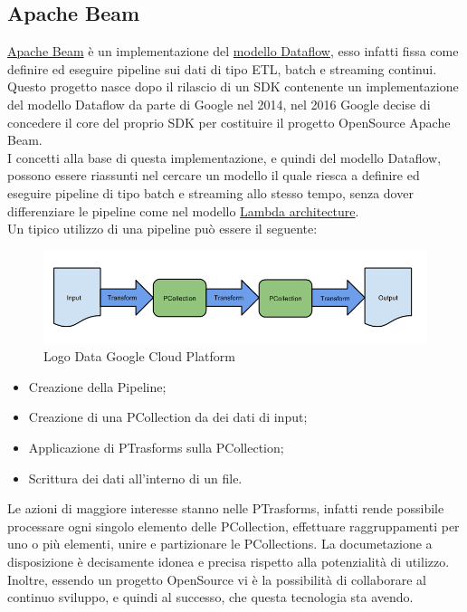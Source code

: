 \subsection{Apache Beam}
\href{http://www.vldb.org/pvldb/vol8/p1792-Akidau.pdf}{Apache Beam} è un implementazione del \href{https://ai.google/research/pubs/pub43864}{modello Dataflow}, esso infatti fissa come definire ed eseguire pipeline sui dati di tipo \gls{ETL}, batch e streaming continui. Questo progetto nasce dopo il rilascio di un \gls{SDK} contenente un implementazione del modello Dataflow da parte di Google nel 2014, nel 2016 Google decise di concedere il core del proprio SDK per costituire il progetto \gls{OpenSource} Apache Beam.
\\ I concetti alla base di questa implementazione, e quindi del modello Dataflow, possono essere riassunti nel cercare un modello il quale riesca a definire ed eseguire pipeline di tipo batch e streaming allo stesso tempo, senza dover differenziare le pipeline come nel modello \href{https://en.wikipedia.org/wiki/Lambda_architecture}{Lambda architecture}.
\\ Un tipico utilizzo di una pipeline può essere il seguente:
\begin{figure}[h!]
	\centering
	\includegraphics[scale=0.5]{figures/design-your-pipeline-linear}
	\caption[Short figure name.]{Logo Data Google Cloud Platform
		\label{fig:logoGCP}}
\end{figure}	
\begin{itemize}
	\item Creazione della Pipeline;
	\item Creazione di una PCollection da dei dati di input;
	\item Applicazione di PTrasforms sulla PCollection;
	\item Scrittura dei dati all'interno di un file.
\end{itemize}
Le azioni di maggiore interesse stanno nelle PTrasforms, infatti rende possibile processare ogni singolo elemento delle PCollection, effettuare raggruppamenti per uno o più elementi, unire  e partizionare le PCollections.
La documetazione a disposizione è decisamente idonea e precisa rispetto alla potenzialità di utilizzo. Inoltre, essendo un progetto OpenSource vi è la possibilità di collaborare al continuo sviluppo, e quindi al successo, che questa tecnologia sta avendo.
